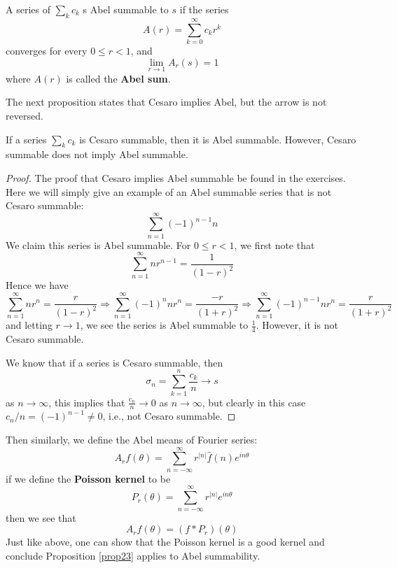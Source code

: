 \begin{defn}
    A series of $\sum_kc_k$ s Abel summable to $s$ if the series 
    \begin{equation*}
        A(r)=\sum_{k=0}^\infty c_kr^k
    \end{equation*}
    converges for every $0\leq r<1$, and 
    \begin{equation*}
        \lim_{r\to 1}A_r(s)=1
    \end{equation*}
    where $A(r)$ is called the \textbf{Abel sum}. 
\end{defn}
The next proposition states that Cesaro implies Abel, but the arrow is not reversed.
\begin{prop}\label{prop23}
    If a series $\sum_kc_k$ is Cesaro summable, then it is Abel summable. However, Cesaro summable does not imply Abel summable.
\end{prop}
\begin{proof}
    The proof that Cesaro implies Abel summable be found in the exercises. Here we will simply give an example of an Abel summable series that is not Cesaro summable:
    \begin{equation*}
        \sum_{n=1}^\infty (-1)^{n-1}n
    \end{equation*}
    We claim this series is Abel summable. For $0\leq r<1$, we first note that  
    \begin{equation*}
        \sum_{n=1}^\infty nr^{n-1}=\frac{1}{(1-r)^2}
    \end{equation*}
    Hence we have 
    \begin{equation*}
        \sum_{n=1}^\infty nr^n=\frac{r}{(1-r)^2}\Rightarrow \sum_{n=1}^\infty (-1)^n nr^n=\frac{-r}{(1+r)^2}\Rightarrow \sum_{n=1}^\infty (-1)^{n-1}nr^n=\frac{r}{(1+r)^2}
    \end{equation*}
    and letting $r\to 1$, we see the series is Abel summable to $\frac{1}{4}$. However, it is not Cesaro summable.

    We know that if a series is Cesaro summable, then 
    \begin{equation*}
        \sigma_n=\sum_{k=1}^n\frac{c_k}{n}\to s
    \end{equation*}
    as $n\to\infty$, this implies that $\frac{c_n}{n}\to 0$ as $n\to\infty$, but clearly in this case $c_n/n=(-1)^{n-1}\neq 0$, i.e., not Cesaro summable.
\end{proof}
Then similarly, we define the Abel means of Fourier series:
\begin{equation*}
    A_rf(\theta)=\sum_{n=-\infty}^\infty r^{|n|}\hat{f}(n)e^{in\theta}
\end{equation*}
if we define the \textbf{Poisson kernel} to be 
\begin{equation*}
    P_r(\theta)=\sum_{n=-\infty}^\infty r^{|n|}e^{in\theta}
\end{equation*}
then we see that 
\begin{equation*}
    A_rf(\theta)=(f\ast P_r)(\theta)
\end{equation*}
Just like above, one can show that the Poisson kernel is a good kernel and conclude Proposition \ref{prop23} applies to Abel summability.








